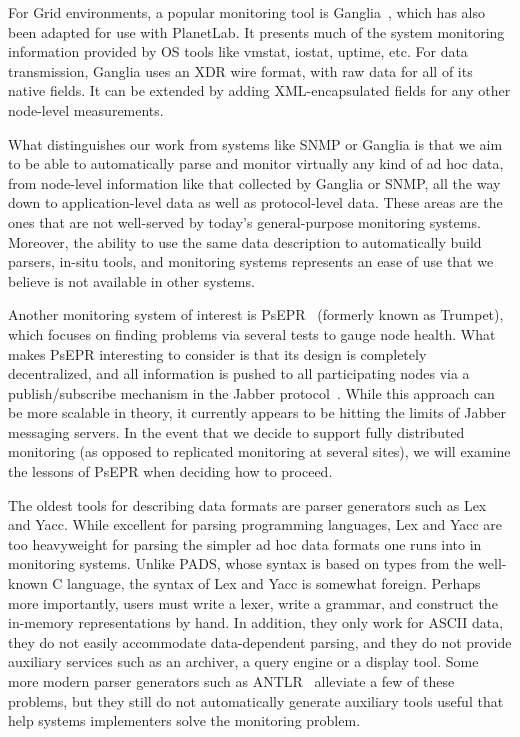 \documentclass{sigplanconf}
\begin{document}
For Grid environments, a popular monitoring tool is
Ganglia~\cite{ganglia}, which has also been adapted for use with
PlanetLab. It presents much of the system monitoring information
provided by OS tools like vmstat, iostat, uptime, etc. For data
transmission, Ganglia uses an XDR wire format, with raw data for all
of its native fields.  It can be extended by adding XML-encapsulated
fields for any other node-level measurements. 

What distinguishes our work from systems like SNMP or Ganglia is
that we aim to be able to automatically parse and monitor virtually
any kind of ad hoc data, from node-level information like that
collected by Ganglia or SNMP, all the way down to application-level
data as well as protocol-level data. These areas are the ones that are
not well-served by today's general-purpose monitoring
systems. Moreover, the ability to use the same data description to
automatically build parsers, in-situ tools, and monitoring systems
represents an ease of use that we believe is not available in other
systems.

Another monitoring system of interest is PsEPR~\cite{psepr} (formerly
known as Trumpet), which focuses on finding problems via several tests
to gauge node health. What makes PsEPR interesting to consider is that
its design is completely decentralized, and all information is pushed
to all participating nodes via a publish/subscribe mechanism in the
Jabber protocol~\cite{jabber}. While this approach can be more
scalable in theory, it currently appears to be hitting the limits of
Jabber messaging servers. In the event that we decide to support
fully distributed monitoring (as opposed to replicated monitoring at
several sites), we will examine the lessons of PsEPR when deciding how
to proceed.

The oldest tools for describing data formats are parser generators such as
Lex and Yacc.  While excellent for parsing programming languages, Lex and Yacc
are too heavyweight for parsing the simpler ad hoc data formats one
runs into in monitoring systems.   
Unlike PADS, whose syntax is based on types from the well-known C language,
the syntax of Lex and Yacc is somewhat foreign.  Perhaps more importantly,
users must write a lexer, write a
grammar, and construct the in-memory representations by hand.  In
addition, they only work for ASCII data, they do not easily
accommodate data-dependent parsing, and they do not provide auxiliary
services such as an archiver, a query engine or a display tool.
Some more modern parser generators such as ANTLR~\cite{antlr} alleviate
a few of these problems, but they still do not automatically generate auxiliary tools
useful that help systems implementers solve the monitoring problem. 
\end{document}
